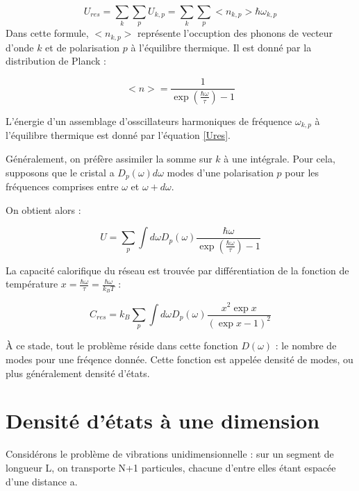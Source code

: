 \begin{equation}
    U_{res} = \sum_k \sum_p U_{k,p} = \sum_k \sum_p <n_{k,p}> \hbar \omega_{k,p}
    \label{Ures}
\end{equation}
Dans cette formule, $<n_{k,p}>$ représente l'occuption des phonons de vecteur
d'onde $k$ et de polarisation $p$ à l'équilibre thermique. Il est donné par la
distribution de Planck :

\begin{equation}
    <n> = \frac{1}{\exp \left( \frac{\hbar \omega}{\tau} \right) - 1}
    \label{distrplanck}
\end{equation}

L'énergie d'un assemblage d'osscillateurs harmoniques de fréquence
$\omega_{k,p}$ à l'équilibre thermique est donné par l'équation \ref{Ures}.

Généralement, on préfère assimiler la somme sur $k$ à une intégrale. Pour cela,
supposons que le cristal a $D_p(\omega) d\omega$ modes d'une polarisation $p$
pour les fréquences comprises entre $\omega$ et $\omega + d\omega$.

On obtient alors :

\begin{equation}
    U = \sum_p \int d\omega D_p(\omega) \frac{\hbar \omega}{\exp \left( \frac{\hbar\omega}{\tau} \right) -1}
    \label{Uresint}
\end{equation}

La capacité calorifique du réseau est trouvée par différentiation de la fonction
de température $x = \frac{\hbar \omega}{\tau} = \frac{\hbar\omega}{k_B T}$ :

\begin{equation}
    C_{res} = k_B \sum_p \int d\omega D_p(\omega) \frac{x^2 \exp x}{(\exp x -1)^2}
    \label{Cres}
\end{equation}

À ce stade, tout le problème réside dans cette fonction $D(\omega)$ : le nombre
de modes pour une fréqence donnée. Cette fonction est appelée densité de modes,
ou plus généralement densité d'états.

\section{Densité d'états à une dimension}

Considérons le problème de vibrations unidimensionnelle : sur un segment de
longueur L, on transporte N+1 particules, chacune d'entre elles étant espacée
d'une distance a.

